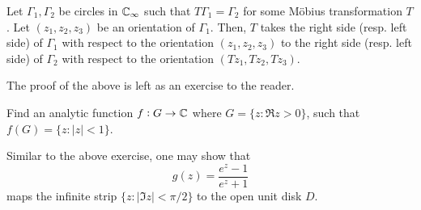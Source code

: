 	\begin{theorem}
		Let $\Gamma_1,\Gamma_2$ be circles in $\mathbb{C}_\infty$ such that $T\Gamma_1 = \Gamma_2$ for some M\"{o}bius transformation $T$. Let $(z_1,z_2,z_3)$ be an orientation of $\Gamma_1$. Then, $T$ takes the right side (resp. left side) of $\Gamma_1$ with respect to the orientation $(z_1,z_2,z_3)$ to the right side (resp. left side) of $\Gamma_2$ with respect to the orientation $(Tz_1,Tz_2,Tz_3)$.
	\end{theorem}
	The proof of the above is left as an exercise to the reader.


	\begin{exercise}
		Find an analytic function $f : G \to \mathbb{C}$ where $G = \{ z : \Re z > 0 \}$, such that $f(G) = \{ z : |z| < 1 \}$.
	\end{exercise}

	Similar to the above exercise, one may show that
	\[ g(z) = \frac{e^z - 1}{e^z + 1} \]
	maps the infinite strip $\{ z : |\Im z| < \pi/2 \}$ to the open unit disk $D$.